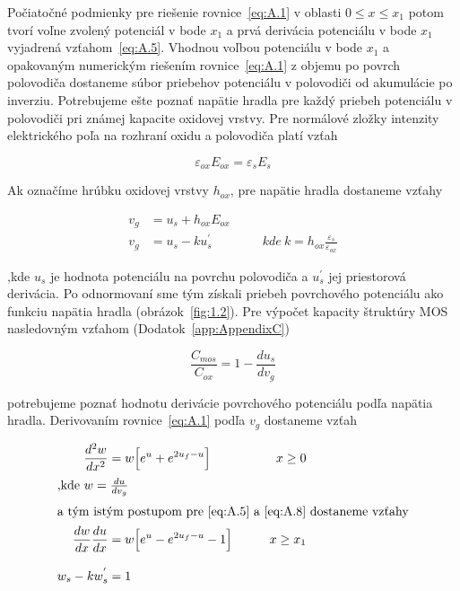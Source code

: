  Počiatočné podmienky pre riešenie rovnice~\ref{eq:A.1} v oblasti
 ${0\leq{x}\leq{x_1}}$ potom tvorí voľne zvolený potenciál v bode
 $x_1$ a prvá derivácia potenciálu v bode $x_1$ vyjadrená
 vzťahom~\ref{eq:A.5}. Vhodnou voľbou potenciálu v bode $x_1$ a
 opakovaným numerickým riešením rovnice~\ref{eq:A.1} z objemu po
 povrch polovodiča dostaneme súbor priebehov potenciálu v polovodiči
 od akumulácie po inverziu. Potrebujeme ešte poznať napätie hradla pre
 každý priebeh potenciálu v polovodiči pri známej kapacite oxidovej
 vrstvy.  Pre normálové zložky intenzity elektrického poľa na rozhraní
 oxidu a polovodiča platí vzťah

\begin{equation}\label{eq:A.6}
  \varepsilon_{ox}E_{ox} = \varepsilon_s{E_s}
\end{equation}

Ak označíme hrúbku oxidovej vrstvy $h_{ox}$, pre napätie hradla
dostaneme vzťahy

\begin{align}
  v_g &= u_s + h_{ox}E_{ox} \label{eq:A.7} \\
  v_g &= u_s - ku_{s}^{'} \qquad\qquad kde\ {k = h_{ox}\frac{\varepsilon_s}{\varepsilon_{ox}}} \label{eq:A.8}
\end{align}

,kde $u_s$ je hodnota potenciálu na povrchu polovodiča a $u_{s}^{'}$
jej priestorová derivácia. Po odnormovaní sme tým získali priebeh
povrchového potenciálu ako funkciu napätia hradla
(obrázok~\ref{fig:1.2}). Pre výpočet kapacity štruktúry MOS
nasledovným vzťahom (Dodatok~\ref{app:AppendixC})

\begin{equation}\label{eq:A.9}
  \frac{C_{mos}}{C_{ox}} = 1 - \frac{du_s}{dv_g}
\end{equation}

potrebujeme poznať hodnotu derivácie povrchového potenciálu podľa
napätia hradla. Derivovaním rovnice~\ref{eq:A.1} podľa $v_g$ dostaneme
vzťah

\begin{samepage}
\begin{subequations}\label{eq:A.10}
  \begin{align}
    \frac{d^{2}w}{dx^2} &= w \Big[e^u + e^{2u_f-u}\Big] \qquad &{x\ge{0}} \label{eq:A.10a} \\
    \intertext{,kde $w=\frac{du}{dv_g}$}
    \intertext{a tým istým postupom pre~\ref{eq:A.5} a~\ref{eq:A.8} dostaneme vzťahy}
    \frac{dw}{dx}\frac{du}{dx} &= w \Big[e^u - e^{2u_f-u} - 1\Big] \qquad &{x\ge{x_1}} \label{eq:A.10b} \\[0.3cm]
    w_s - kw_s^{'} &= 1 \label{eq:A.10c}
  \end{align}
\end{subequations}
\end{samepage}

